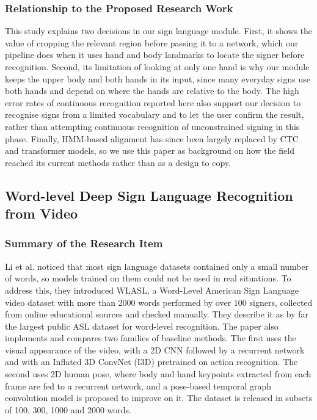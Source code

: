 \documentclass{FastFyp}
\begin{document}
\subsubsection*{Relationship to the Proposed Research Work}
This study explains two decisions in our sign language module. First, it shows the value of cropping the relevant region before passing it to a network, which our pipeline does when it uses hand and body landmarks to locate the signer before recognition. Second, its limitation of looking at only one hand is why our module keeps the upper body and both hands in its input, since many everyday signs use both hands and depend on where the hands are relative to the body. The high error rates of continuous recognition reported here also support our decision to recognise signs from a limited vocabulary and to let the user confirm the result, rather than attempting continuous recognition of unconstrained signing in this phase. Finally, HMM-based alignment has since been largely replaced by CTC and transformer models, so we use this paper as background on how the field reached its current methods rather than as a design to copy.

\subsection{Word-level Deep Sign Language Recognition from Video}
\subsubsection*{Summary of the Research Item}
Li et al. \cite{ref:Li:2020} noticed that most sign language datasets contained only a small number of words, so models trained on them could not be used in real situations. To address this, they introduced WLASL, a Word-Level American Sign Language video dataset with more than 2000 words performed by over 100 signers, collected from online educational sources and checked manually. They describe it as by far the largest public ASL dataset for word-level recognition. The paper also implements and compares two families of baseline methods. The first uses the visual appearance of the video, with a 2D CNN followed by a recurrent network and with an Inflated 3D ConvNet (I3D) pretrained on action recognition. The second uses 2D human pose, where body and hand keypoints extracted from each frame are fed to a recurrent network, and a pose-based temporal graph convolution model is proposed to improve on it. The dataset is released in subsets of 100, 300, 1000 and 2000 words.
\end{document}
